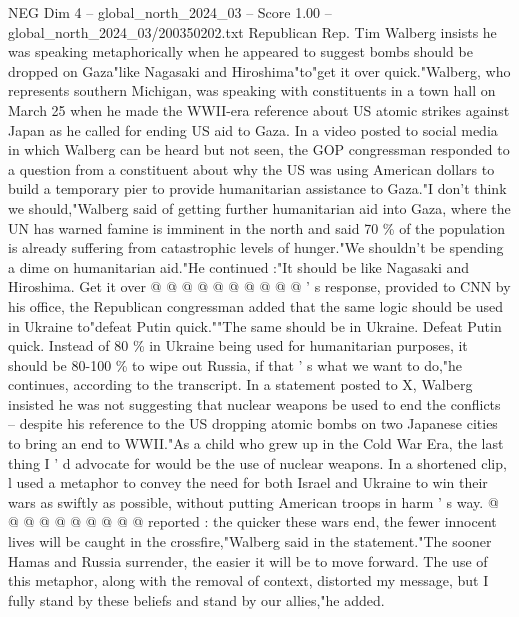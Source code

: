\begin{textsample}{NEG Dim 4 – global\_north\_2024\_03 – Score 1.00 – global\_north\_2024\_03/200350202.txt}  \label{ex:f4_neg_211}
Republican Rep.
Tim Walberg insists he was speaking metaphorically when he appeared to suggest bombs should be dropped on Gaza"like Nagasaki and Hiroshima"to"get it over quick."Walberg, who represents southern Michigan, was speaking with constituents in a town hall on March 25 when he made the WWII-era reference about US atomic strikes against Japan as he called for ending US aid to Gaza.
In a video posted to social media in which Walberg can be heard but not seen, the GOP congressman responded to a question from a constituent about why the US was using American dollars to build a temporary pier to provide humanitarian assistance to Gaza."I don't think we should,"Walberg said of getting further humanitarian aid into Gaza, where the UN has warned famine is imminent in the north and said 70 \% of the population is already suffering from catastrophic levels of hunger."We shouldn't be spending a dime on humanitarian aid."He continued :"It should be like Nagasaki and Hiroshima.
Get it over @ @ @ @ @ @ @ @ @ @ ' s response, provided to CNN by his office, the Republican congressman added that the same logic should be used in Ukraine to"defeat Putin quick.""The same should be in Ukraine.
Defeat Putin quick.
Instead of 80 \% in Ukraine being used for humanitarian purposes, it should be 80-100 \% to wipe out Russia, if that ' s what we want to do,"he continues, according to the transcript.
In a statement posted to X, Walberg insisted he was not suggesting that nuclear weapons be used to end the conflicts -- despite his reference to the US dropping atomic bombs on two Japanese cities to bring an end to WWII."As a child who grew up in the Cold War Era, the last thing I ' d advocate for would be the use of nuclear weapons.
In a shortened clip, l used a metaphor to convey the need for both Israel and Ukraine to win their wars as swiftly as possible, without putting American troops in harm ' s way. @ @ @ @ @ @ @ @ @ @ reported : the quicker these wars end, the fewer innocent lives will be caught in the crossfire,"Walberg said in the statement."The sooner Hamas and Russia surrender, the easier it will be to move forward.
The use of this metaphor, along with the removal of context, distorted my message, but I fully stand by these beliefs and stand by our allies,"he added.

\end{textsample}
